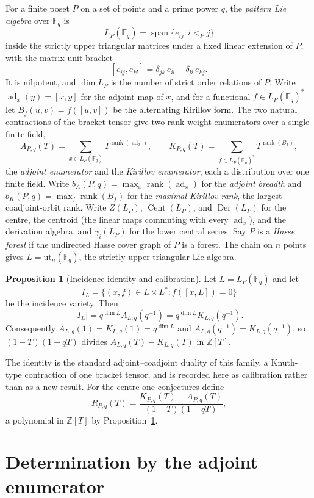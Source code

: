 \documentclass[11pt]{article}
\theoremstyle{definition}
\newcommand{\rank}{\operatorname{rank}}
\newcommand{\Fq}{\mathbb F}
\newcommand{\Z}{\mathbb Z}
\providecommand{\Z}{\mathbb Z}
\newtheorem{proposition}{Proposition}
\begin{document}
For a finite poset $P$ on a set of points and a prime power $q$, the \emph{pattern Lie algebra} over $\Fq_q$ is
\[
L_P(\Fq_q)=\operatorname{span}\{e_{ij}:i<_Pj\}
\]
inside the strictly upper triangular matrices under a fixed linear extension of $P$, with the matrix-unit bracket
\[
[e_{ij},e_{kl}]=\delta_{jk}\,e_{il}-\delta_{li}\,e_{kj}.
\]
It is nilpotent, and $\dim L_P$ is the number of strict order relations of $P$.  Write $\operatorname{ad}_x(y)=[x,y]$ for the adjoint map of $x$, and for a functional $f\in L_P(\Fq_q)^*$ let $B_f(u,v)=f([u,v])$ be the alternating Kirillov form.  The two natural contractions of the bracket tensor give two rank-weight enumerators over a single finite field,
\[
A_{P,q}(T)=\sum_{x\in L_P(\Fq_q)}T^{\rank(\operatorname{ad}_x)},
\qquad
K_{P,q}(T)=\sum_{f\in L_P(\Fq_q)^*}T^{\rank(B_f)},
\]
the \emph{adjoint enumerator} and the \emph{Kirillov enumerator}, each a distribution over one finite field.  Write $b_A(P,q)=\max_x\rank(\operatorname{ad}_x)$ for the \emph{adjoint breadth} and $b_K(P,q)=\max_f\rank(B_f)$ for the \emph{maximal Kirillov rank}, the largest coadjoint-orbit rank.  Write $Z(L_P)$, $\operatorname{Cent}(L_P)$, and $\operatorname{Der}(L_P)$ for the centre, the centroid (the linear maps commuting with every $\operatorname{ad}_x$), and the derivation algebra, and $\gamma_i(L_P)$ for the lower central series.  Say $P$ is a \emph{Hasse forest} if the undirected Hasse cover graph of $P$ is a forest.  The chain on $n$ points gives $L=\mathrm{ut}_n(\Fq_q)$, the strictly upper triangular Lie algebra.

\begin{proposition}[Incidence identity and calibration]\label{v:calib}
Let $L=L_P(\Fq_q)$ and let
\[
I_L=\{(x,f)\in L\times L^*:f([x,L])=0\}
\]
be the incidence variety.  Then
\[
|I_L|=q^{\dim L}A_{L,q}(q^{-1})=q^{\dim L}K_{L,q}(q^{-1}).
\]
Consequently $A_{L,q}(1)=K_{L,q}(1)=q^{\dim L}$ and $A_{L,q}(q^{-1})=K_{L,q}(q^{-1})$, so $(1-T)(1-qT)$ divides $A_{L,q}(T)-K_{L,q}(T)$ in $\Z[T]$.
\end{proposition}

The identity is the standard adjoint--coadjoint duality of this family, a Knuth-type contraction of one bracket tensor, and is recorded here as calibration rather than as a new result.  For the centre-one conjectures define
\[
R_{P,q}(T)=\frac{K_{P,q}(T)-A_{P,q}(T)}{(1-T)(1-qT)},
\]
a polynomial in $\Z[T]$ by Proposition~\ref{v:calib}.

\section{Determination by the adjoint enumerator}
\end{document}
